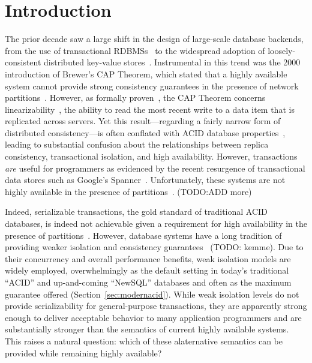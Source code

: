 
\section{Introduction}

The prior decade saw a large shift in the design of large-scale
database backends, from the use of transactional
RDBMSs~\cite{bernstein-concurrency, bernstein-book, gray-isolation,
  gray-virtues} to the widespread adoption of loosely-consistent
distributed key-value stores~\cite{bigtable, pnuts,
  dynamo}. Instrumental in this trend was the 2000 introduction of
Brewer's CAP Theorem, which stated that a highly available system
cannot provide strong consistency guarantees in the presence of
network partitions~\cite{brewer-slides}. However, as formally
proven~\cite{gilbert-cap}, the CAP Theorem concerns
linearizability~\cite{herlihy-art}, the ability to read the most
recent write to a data item that is replicated across servers. Yet
this result---regarding a fairly narrow form of distributed
consistency---is often conflated with ACID database
properties~\cite{brewer-slides, hn, foundation-article}, leading to
substantial confusion about the relationships between replica
consistency, transactional isolation, and high availability. However,
transactions \textit{are} useful for programmers as evidenced by the
recent resurgence of transactional data stores such as Google's
Spanner~\cite{spanner}. Unfortunately, these systems are not highly
available in the presence of partitions~\cite{walter, mdcc,
  foundation-article, krikellas-bargain, eiger}. (TODO:ADD more)

Indeed, serializable transactions, the gold standard of traditional
ACID databases, is indeed not achievable given a requirement for high
availability in the presence of
partitions~\cite{davidson-survey}. However, database systems have a
long tradition of providing weaker isolation and consistency
guarantees~\cite{adya, ansicritique, gray-isolation,
  gray-virtues} (TODO: kemme). Due to their concurrency and overall performance
benefits, weak isolation models are widely employed, overwhelmingly as
the default setting in today's traditional ``ACID'' and up-and-coming
``NewSQL'' databases and often as the maximum guarantee offered
(Section~\ref{sec:modernacid}). While weak isolation levels do not
provide serializability for general-purpose transactions, they are
apparently strong enough to deliver acceptable behavior to many
application programmers and are substantially stronger than the
semantics of current highly available systems. This raises a natural
question: which of these alaternative semantics can be provided while
remaining highly available?

